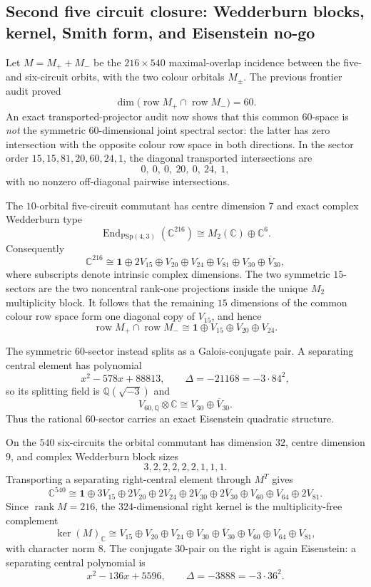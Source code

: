 \subsection{Second five circuit closure: Wedderburn blocks, kernel, Smith form, and Eisenstein no-go}

Let $M=M_++M_-$ be the $216\times540$ maximal-overlap incidence between the
five- and six-circuit orbits, with the two colour orbitals $M_\pm$.  The
previous frontier audit proved
\[
 \dim\bigl(\operatorname{row}M_+\cap\operatorname{row}M_-\bigr)=60.
\]
An exact transported-projector audit now shows that this common $60$-space is
\emph{not} the symmetric $60$-dimensional joint spectral sector: the latter
has zero intersection with the opposite colour row space in both directions.
In the sector order $15,15,81,20,60,24,1$, the diagonal transported
intersections are
\[
 0,\ 0,\ 0,\ 20,\ 0,\ 24,\ 1,
\]
with no nonzero off-diagonal pairwise intersections.

The $10$-orbital five-circuit commutant has centre dimension $7$ and exact
complex Wedderburn type
\[
 \operatorname{End}_{\mathrm{PSp}(4,3)}(\mathbb C^{216})
 \cong M_2(\mathbb C)\oplus\mathbb C^6.
\]
Consequently
\[
 \mathbb C^{216}\cong
 \mathbf1\oplus 2V_{15}\oplus V_{20}\oplus V_{24}
 \oplus V_{81}\oplus V_{30}\oplus\overline{V}_{30},
\]
where subscripts denote intrinsic complex dimensions.  The two symmetric
$15$-sectors are the two noncentral rank-one projections inside the unique
$M_2$ multiplicity block.  It follows that the remaining $15$ dimensions of
the common colour row space form one diagonal copy of $V_{15}$, and hence
\[
 \boxed{\operatorname{row}M_+\cap\operatorname{row}M_-
 \cong \mathbf1\oplus V_{15}\oplus V_{20}\oplus V_{24}.}
\]

The symmetric $60$-sector instead splits as a Galois-conjugate pair.  A
separating central element has polynomial
\[
 x^2-578x+88813,
 \qquad \Delta=-21168=-3\cdot84^2,
\]
so its splitting field is $\mathbb Q(\sqrt{-3})$ and
\[
 \boxed{V_{60,\mathbb Q}\otimes\mathbb C
       \cong V_{30}\oplus\overline V_{30}.}
\]
Thus the rational $60$-sector carries an exact Eisenstein quadratic structure.

On the $540$ six-circuits the orbital commutant has dimension $32$, centre
dimension $9$, and complex Wedderburn block sizes
\[
 3,2,2,2,2,2,1,1,1.
\]
Transporting a separating right-central element through $M^T$ gives
\[
 \mathbb C^{540}\cong
 \mathbf1\oplus3V_{15}\oplus2V_{20}\oplus2V_{24}
 \oplus2V_{30}\oplus2\overline V_{30}
 \oplus V_{60}\oplus V_{64}\oplus2V_{81}.
\]
Since $\operatorname{rank}M=216$, the $324$-dimensional right kernel is the
multiplicity-free complement
\[
 \boxed{\ker(M)_\mathbb C\cong
 V_{15}\oplus V_{20}\oplus V_{24}\oplus V_{30}\oplus\overline V_{30}
 \oplus V_{60}\oplus V_{64}\oplus V_{81},}
\]
with character norm $8$.  The conjugate $30$-pair on the right is again
Eisenstein: a separating central polynomial is
\[
 x^2-136x+5596,
 \qquad \Delta=-3888=-3\cdot36^2.
\]


